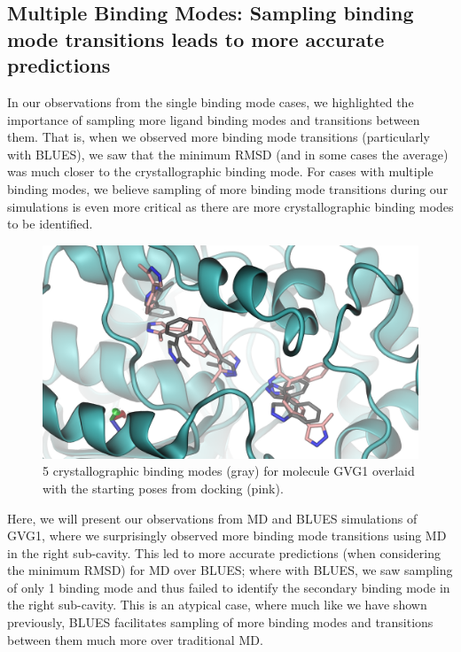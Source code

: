 \subsection{Multiple Binding Modes: Sampling binding mode transitions leads to more accurate predictions}
In our observations from the single binding mode cases, we highlighted the importance of sampling more ligand binding modes and transitions between them.
That is, when we observed more binding mode transitions (particularly with BLUES), we saw that the minimum RMSD (and in some cases the average) was much closer to the crystallographic binding mode.
For cases with multiple binding modes, we believe sampling of more binding mode transitions during our simulations is even more critical as there are more crystallographic binding modes to be identified.

\begin{figure}
    \centering
    \includegraphics[width=\linewidth]{chapter6/Figures/GVG_1-poses.png}
    \caption[GVG1 docked poses]{5 crystallographic binding modes (gray) for molecule GVG1 overlaid with the starting poses from docking (pink).}
    \label{fig:GVG1-poses}
\end{figure}

Here, we will present our observations from MD and BLUES simulations of GVG1, where we surprisingly observed more binding mode transitions using MD in the right sub-cavity.
This led to more accurate predictions (when considering the minimum RMSD) for MD over BLUES; where with BLUES, we saw sampling of only 1 binding mode and thus failed to identify the secondary binding mode in the right sub-cavity.
This is an atypical case, where much like we have shown previously, BLUES facilitates sampling of more binding modes and transitions between them much more over traditional MD.

